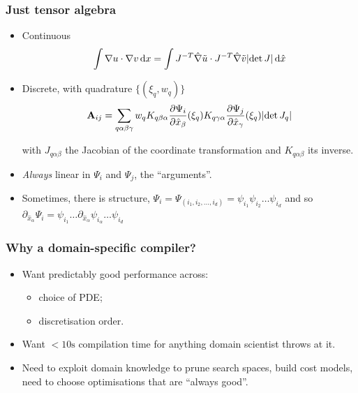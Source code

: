 \documentclass[presentation]{beamer}
\DeclarePairedDelimiter\abs{\lvert}{\rvert}%
\begin{document}
\begin{frame}
  \frametitle{Just tensor algebra}
  \begin{itemize}
  \item Continuous
    \begin{equation*}
      \int \nabla u \cdot \nabla v \,\text{d}x = \int J^{-T}\hat{\nabla}
      \tilde u \cdot J^{-T}\hat{\nabla} \tilde v \abs{\det J}\,\text{d}\hat{x}
    \end{equation*}
  \item Discrete, with quadrature $\{(\xi_q, w_q)\}$
    \begin{equation*}
      \mathbf{A}_{i j} = \sum_{q\alpha \beta \gamma} w_q K_{q\beta \alpha}
      \frac{\partial{\Psi_i}}{\partial \hat{x}_\beta}(\xi_{q})
      K_{q\gamma \alpha} \frac{\partial{\Psi_j}}{\partial \hat{x}_\gamma}(\xi_{q})
      \abs{\det J_q}
    \end{equation*}

    with $J_{q\alpha\beta}$ the Jacobian of the coordinate transformation and
    $K_{q\alpha\beta}$ its inverse.
  \item \emph{Always} linear in $\Psi_i$ and $\Psi_j$, the ``arguments''.
  \item Sometimes, there is structure, $\Psi_i = \Psi_{(i_1,i_2,\dots,i_d)} =
    \psi_{i_1}\psi_{i_2}\dots\psi_{i_d}$ and so
    $\partial_{\hat{x}_\alpha}\Psi_i =
    \psi_{i_1}\dots\partial_{\hat{x}_\alpha}\psi_{i_\alpha}\dots\psi_{i_d}$
  \end{itemize}
\end{frame}

\begin{frame}
  \frametitle{Why a domain-specific compiler?}
  \begin{itemize}
  \item Want predictably good performance across:
    \begin{itemize}
    \item choice of PDE;
    \item discretisation order.
    \end{itemize}
  \item Want $<10\text{s}$ compilation time for anything domain
    scientist throws at it.
  \item Need to exploit domain knowledge to prune search spaces,
    build cost models, need to choose optimisations that are ``always
    good''.
  \end{itemize}
\end{frame}
\end{document}

